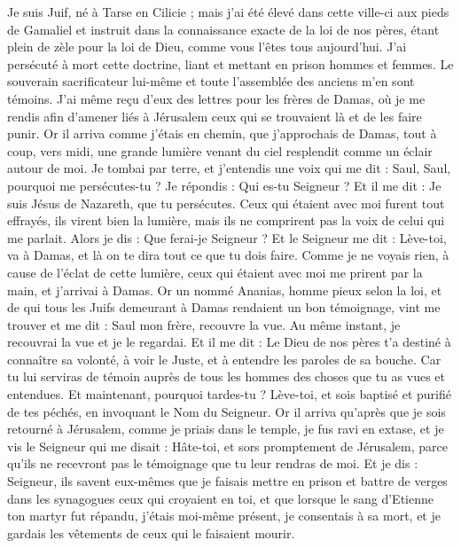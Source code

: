 \begin{multicols}{2}
Je suis Juif, né à Tarse en Cilicie ; mais j’ai été élevé dans cette ville-ci aux pieds de Gamaliel et instruit dans la connaissance exacte de la loi de nos pères, étant plein de zèle pour la loi de Dieu, comme vous l'êtes tous aujourd'hui.
J’ai persécuté à mort cette doctrine, liant et mettant en prison hommes et femmes.
Le souverain sacrificateur lui-même et toute l'assemblée des anciens m'en sont témoins. J’ai même reçu d’eux des lettres pour les frères de Damas, où je me rendis afin d’amener liés à Jérusalem ceux qui se trouvaient là et de les faire punir.
Or il arriva comme j’étais en chemin, que j'approchais de Damas, tout à coup, vers midi, une grande lumière venant du ciel resplendit comme un éclair autour de moi.
Je tombai par terre, et j'entendis une voix qui me dit : Saul, Saul, pourquoi me persécutes-tu ?
Je répondis : Qui es-tu Seigneur ? Et il me dit : Je suis Jésus de Nazareth, que tu persécutes.
Ceux qui étaient avec moi furent tout effrayés, ils virent bien la lumière, mais ils ne comprirent pas la voix de celui qui me parlait. Alors je dis : Que ferai-je Seigneur ?
Et le Seigneur me dit : Lève-toi, va à Damas, et là on te dira tout ce que tu dois faire.
Comme je ne voyais rien, à cause de l’éclat de cette lumière, ceux qui étaient avec moi me prirent par la main, et j’arrivai à Damas.
Or un nommé Ananias, homme pieux selon la loi, et de qui tous les Juifs demeurant à Damas rendaient un bon témoignage, vint me trouver
et me dit : Saul mon frère, recouvre la vue. Au même instant, je recouvrai la vue et je le regardai.
Et il me dit : Le Dieu de nos pères t'a destiné à connaître sa volonté, à voir le Juste, et à entendre les paroles de sa bouche.
Car tu lui serviras de témoin auprès de tous les hommes des choses que tu as vues et entendues.
Et maintenant, pourquoi tardes-tu ? Lève-toi, et sois baptisé et purifié de tes péchés, en invoquant le Nom du Seigneur.
Or il arriva qu'après que je sois retourné à Jérusalem, comme je priais dans le temple, je fus ravi en extase,
et je vis le Seigneur qui me disait : Hâte-toi, et sors promptement de Jérusalem, parce qu’ils ne recevront pas le témoignage que tu leur rendras de moi.
Et je dis : Seigneur, ils savent eux-mêmes que je faisais mettre en prison et battre de verges dans les synagogues ceux qui croyaient en toi,
et que lorsque le sang d'Etienne ton martyr fut répandu, j’étais moi-même présent, je consentais à sa mort, et je gardais les vêtements de ceux qui le faisaient mourir.

\end{multicols}
